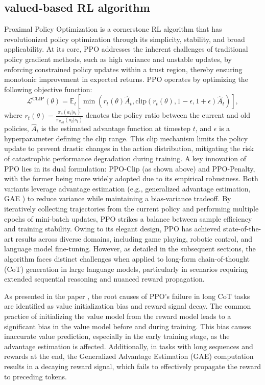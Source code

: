 \subsection{valued-based RL algorithm}
Proximal Policy Optimization is a cornerstone RL algorithm that has revolutionized policy optimization through its simplicity, stability, and broad applicability. At its core, PPO addresses the inherent challenges of traditional policy gradient methods, such as high variance and unstable updates, by enforcing constrained policy updates within a trust region, thereby ensuring monotonic improvement in expected returns. PPO operates by optimizing the following objective function: \[ \mathcal{L}^{\text{CLIP}}(\theta) = \mathbb{E}_t\left[\min\left(r_t(\theta)\hat{A}_t, \text{clip}(r_t(\theta), 1-\epsilon, 1+\epsilon)\hat{A}_t\right)\right], \] where \(r_t(\theta) = \frac{\pi_\theta(a_t|s_t)}{\pi_{\theta_{\text{old}}}(a_t|s_t)}\) denotes the policy ratio between the current and old policies, \(\hat{A}_t\) is the estimated advantage function at timestep \(t\), and \(\epsilon\) is a hyperparameter defining the clip range. This clip mechanism limits the policy update to prevent drastic changes in the action distribution, mitigating the risk of catastrophic performance degradation during training. A key innovation of PPO lies in its dual formulation: PPO-Clip (as shown above) and PPO-Penalty, with the former being more widely adopted due to its empirical robustness. Both variants leverage advantage estimation (e.g., generalized advantage estimation, GAE \cite{gae}) to reduce variance while maintaining a bias-variance tradeoff. By iteratively collecting trajectories from the current policy and performing multiple epochs of mini-batch updates, PPO strikes a balance between sample efficiency and training stability. Owing to its elegant design, PPO has achieved state-of-the-art results across diverse domains, including game playing, robotic control, and language model fine-tuning. However, as detailed in the subsequent sections, the algorithm faces distinct challenges when applied to long-form chain-of-thought (CoT) generation in large language models, particularly in scenarios requiring extended sequential reasoning and nuanced reward propagation.

As presented in the paper \cite{vc-ppo}, the root causes of PPO's failure in long CoT tasks are identified as value initialization bias and reward signal decay. The common practice of initializing the value model from the reward model leads to a significant bias in the value model before and during training. This bias causes inaccurate value prediction, especially in the early training stage, as the advantage estimation is affected. Additionally, in tasks with long sequences and rewards at the end, the Generalized Advantage Estimation (GAE) computation results in a decaying reward signal, which fails to effectively propagate the reward to preceding tokens.

